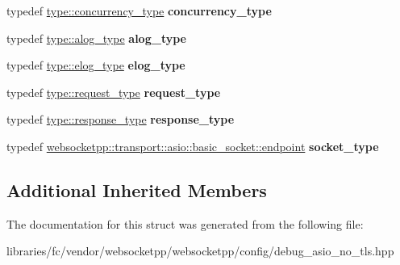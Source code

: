 \begin{DoxyCompactItemize}
\item 
\mbox{\label{structwebsocketpp_1_1config_1_1debug__asio_1_1transport__config_a5ec379ff279ab5903870a071d70fa357}} 
typedef \mbox{\hyperlink{classwebsocketpp_1_1concurrency_1_1basic}{type\+::concurrency\+\_\+type}} {\bfseries concurrency\+\_\+type}
\item 
\mbox{\label{structwebsocketpp_1_1config_1_1debug__asio_1_1transport__config_aa49a07a1e83d4dfa619ee7a93a27d8f9}} 
typedef \mbox{\hyperlink{classwebsocketpp_1_1log_1_1basic}{type\+::alog\+\_\+type}} {\bfseries alog\+\_\+type}
\item 
\mbox{\label{structwebsocketpp_1_1config_1_1debug__asio_1_1transport__config_ae5bdb28a825df63a36a14290d5230e27}} 
typedef \mbox{\hyperlink{structwebsocketpp_1_1config_1_1debug__core_acfa1ded7f80d6a7276b0ec3fd0859fc3}{type\+::elog\+\_\+type}} {\bfseries elog\+\_\+type}
\item 
\mbox{\label{structwebsocketpp_1_1config_1_1debug__asio_1_1transport__config_a4a6d4d4212e18ac8afe0a8b82ee4f925}} 
typedef \mbox{\hyperlink{classwebsocketpp_1_1http_1_1parser_1_1request}{type\+::request\+\_\+type}} {\bfseries request\+\_\+type}
\item 
\mbox{\label{structwebsocketpp_1_1config_1_1debug__asio_1_1transport__config_ab54324c27a7c70ed8ba69ba719156286}} 
typedef \mbox{\hyperlink{classwebsocketpp_1_1http_1_1parser_1_1response}{type\+::response\+\_\+type}} {\bfseries response\+\_\+type}
\item 
\mbox{\label{structwebsocketpp_1_1config_1_1debug__asio_1_1transport__config_a6c62fefe51c2bdfec796778773aa6d8e}} 
typedef \mbox{\hyperlink{classwebsocketpp_1_1transport_1_1asio_1_1basic__socket_1_1endpoint}{websocketpp\+::transport\+::asio\+::basic\+\_\+socket\+::endpoint}} {\bfseries socket\+\_\+type}
\end{DoxyCompactItemize}
\subsection*{Additional Inherited Members}


The documentation for this struct was generated from the following file\+:\begin{DoxyCompactItemize}
\item 
libraries/fc/vendor/websocketpp/websocketpp/config/debug\+\_\+asio\+\_\+no\+\_\+tls.\+hpp\end{DoxyCompactItemize}
